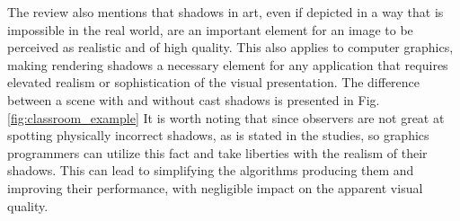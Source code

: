 The review also mentions that shadows in art, even if depicted in a way that is impossible in the real world, are an important element for an image to be perceived as realistic and of high quality. This also applies to computer graphics, making rendering shadows a necessary element for any application that requires elevated realism or sophistication of the visual presentation. The difference between a scene with and without cast shadows is presented in Fig. \ref{fig:classroom_example} It is worth noting that since observers are not great at spotting physically incorrect shadows, as is stated in the studies, so graphics programmers can utilize this fact and take liberties with the realism of their shadows. This can lead to simplifying the algorithms producing them and improving their performance, with negligible impact on the apparent visual quality.

